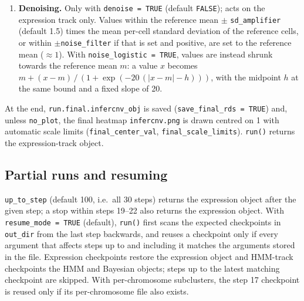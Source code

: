 \begin{enumerate}
\item[\textbf{30}] \textbf{Denoising.} Only with \texttt{denoise\ =\ TRUE} (default \texttt{FALSE}); acts on the expression track only. Values within the reference mean $\pm$ \texttt{sd\_amplifier} (default 1.5) times the mean per-cell standard deviation of the reference cells, or within $\pm$\texttt{noise\_filter} if that is set and positive, are set to the reference mean ($\approx 1$). With \texttt{noise\_logistic\ =\ TRUE}, values are instead shrunk towards the reference mean $m$: a value $x$ becomes $m + (x-m)\,/\,(1+\exp(-20\,(|x-m|-h)))$, with the midpoint $h$ at the same bound and a fixed slope of 20.
\end{enumerate}

At the end, \texttt{run.final.infercnv\_obj} is saved (\texttt{save\_final\_rds\ =\ TRUE}) and, unless \texttt{no\_plot}, the final heatmap \texttt{infercnv.png} is drawn centred on 1 with automatic scale limits (\texttt{final\_center\_val}, \texttt{final\_scale\_limits}). \texttt{run()} returns the expression-track object.

\subsection*{Partial runs and resuming}

\texttt{up\_to\_step} (default 100, i.e.\ all 30 steps) returns the expression object after the given step; a stop within steps 19--22 also returns the expression object. With \texttt{resume\_mode\ =\ TRUE} (default), \texttt{run()} first scans the expected checkpoints in \texttt{out\_dir} from the last step backwards, and reuses a checkpoint only if every argument that affects steps up to and including it matches the arguments stored in the file. Expression checkpoints restore the expression object and HMM-track checkpoints the HMM and Bayesian objects; steps up to the latest matching checkpoint are skipped. With per-chromosome subclusters, the step 17 checkpoint is reused only if its per-chromosome file also exists.

\setcounter{table}{0}
\renewcommand{\thetable}{S\arabic{table}}

